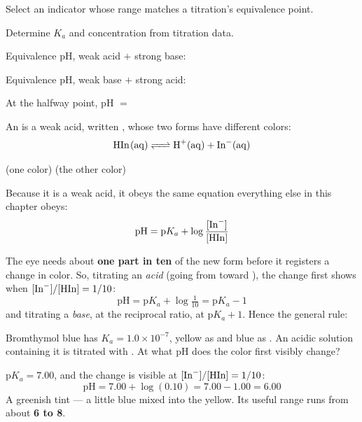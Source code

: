 \documentclass{apchem-notes}
\begin{document}

\begin{objectives}
  \item Select an indicator whose range matches a titration's equivalence
        point.
  \item Determine $K_a$ and concentration from titration data.
\end{objectives}


\begin{warmup}[3]
  \item Equivalence pH, weak acid $+$ strong base:
  \item Equivalence pH, weak base $+$ strong acid:
  \item At the halfway point, pH $=$ 
\end{warmup}



An  is a weak acid, written , whose two
forms have different colors:
\[ \ce{HIn(aq) <=> H+(aq) + In^-(aq)} \]
\centerline{\small (one color) \hfill (the other color)}

Because it is a weak acid, it obeys the same equation everything else in
this chapter obeys:
\[ \mathrm{pH} = \mathrm{p}K_a + \log\frac{[\ce{In^-}]}{[\ce{HIn}]} \]

The eye needs about \textbf{one part in ten} of the new form before it
registers a change in color. So, titrating an \emph{acid} (going from
 toward ), the change first shows when
$[\ce{In^-}]/[\ce{HIn}] = 1/10$:
\[ \mathrm{pH} = \mathrm{p}K_a + \log\tfrac{1}{10}
   = \mathrm{p}K_a - 1 \]
and titrating a \emph{base}, at the reciprocal ratio, at
$\mathrm{p}K_a + 1$. Hence the general rule:

\begin{center}
\end{center}

\begin{workedexample}
Bromthymol blue has $K_a = 1.0\times10^{-7}$, yellow as  and blue as
. An acidic solution containing it is titrated with . At
what pH does the color first visibly change?

$\mathrm{p}K_a = 7.00$, and the change is visible at
$[\ce{In^-}]/[\ce{HIn}] = 1/10$:
\[ \mathrm{pH} = 7.00 + \log(0.10) = 7.00 - 1.00 = \mathbf{6.00} \]
A greenish tint --- a little blue mixed into the yellow. Its useful range
runs from about \textbf{6 to 8}.
\end{workedexample}
\end{document}
